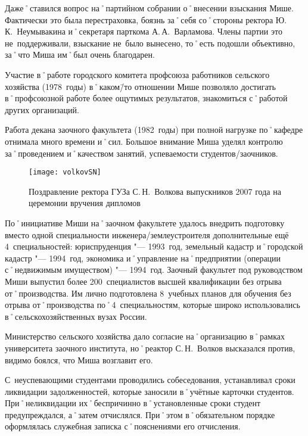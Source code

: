 Даже˚ставился вопрос на˚партийном собрании о˚внесении взыскания Мише. Фактически это была перестраховка, боязнь за˚себя со˚стороны ректора Ю.\,К.~Неумывакина и˚секретаря парткома А.\,А.~Варламова. Члены партии это не~поддерживали, взыскание не~было вынесено, то˚есть подошли объективно, за˚что Миша им˚был очень благодарен.

Участие в˚работе городского комитета профсоюза работников сельского хозяйства (1978~годы) в˚каком\=/то отношении Мише позволяло достигать в˚профсоюзной работе более ощутимых результатов, знакомиться с˚работой других организаций.

Работа декана заочного факультета (1982~годы) при полной нагрузке по˚кафедре отнимала много времени и˚сил. Большое внимание Миша уделял контролю за˚проведением и˚качеством занятий, успеваемости студентов\-/заочников.

\begin{wrapfigure}{O}{.4\textwidth}
\centering
\texttt{[image: volkovSN]}
\caption[Поздравление ректора ГУЗа С.\,Н.~Волкова выпускников 2007 года на церемонии вручения дипломов]{Поздравление ректора ГУЗа С.\,Н.~Волкова выпускников 2007 года на церемонии вручения дипломов\footnotemark}
\label{fig:volkovSN}
\end{wrapfigure}

По˚инициативе Миши на˚заочном факультете удалось внедрить подготовку вместо одной специальности инженера\-/землеустроителя дополнительные ещё 4~специальностей: юриспруденция "--- 1993~год, земельный кадастр и˚городской кадастр "--- 1994~год, экономика и˚управление на˚предприятии (операции с˚недвижимым имуществом) "--- 1994~год. Заочный факультет под руководством Миши выпустил более 200~специалистов высшей квалификации без отрыва от˚производства. Им лично подготовлена 8~учебных планов для обучения без отрыва от˚производства по˚4~специальностям, которые широко использовались в˚сельскохозяйственных вузах России. 

Министерство сельского хозяйства дало согласие на˚организацию в˚рамках университета заочного института, но˚реактор С.\,Н.~Волков высказался против, видимо боялся, что Миша возглавит его.

С~неуспевающими студентами проводились собеседования, устанавливал сроки ликвидации задолженностей, которые заносили в˚учётные карточки студентов. При˚неликвидации их˚беспричинно в˚установленные сроки студент предупреждался, а˚затем отчислялся. При˚этом в˚обязательном порядке оформлялась служебная записка с˚пояснениями его отчисления.

